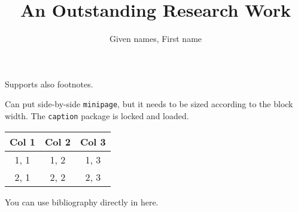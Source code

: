 \documentclass[a2paper]{bigsposter}
\author{Given names, First name}
\title{An Outstanding Research Work}
\institute{Famous Research Institute}
\newcommand{\emptybox}[2]{\framebox[#1]{\rule{0pt}{#2}}}
\begin{document}
  \maketitle
  \begin{blockrow}
    \textcolor{lightgray}{\lipsum[1]}
    Supports also footnotes.
  \blockbreak
    \textcolor{lightgray}{\lipsum[2]}
    \begin{minipage}[t]{0.3\blockwidth}
      Can put side-by-side \texttt{minipage}, but it needs to be sized according to the block width. The \texttt{caption} package is locked and loaded.
    \end{minipage}
    \begin{minipage}[t]{0.7\blockwidth}
      \begin{blockfigure}
        \emptybox{0.9\textwidth}{4em}
      \end{blockfigure}
    \end{minipage}
  \end{blockrow}
  \begin{blockrow}[3]
    \begin{blockfigure}
      \emptybox{0.8\blockwidth}{5em}
    \end{blockfigure}
    \textcolor{lightgray}{\lipsum[3]}
  \blockbreak
    \textcolor{lightgray}{\lipsum[4]}
    \begin{blocktable}
      \begin{tabular}{c|c|c}
        \textbf{Col 1} & \textbf{Col 2} & \textbf{Col 3} \\\hline\hline
        1, 1 & 1, 2 & 1, 3 \\
        2, 1 & 2, 2 & 2, 3 \\\hline
      \end{tabular}
    \end{blocktable}
    \textcolor{lightgray}{\lipsum[5]}
  \blockbreak
    \textcolor{lightgray}{\lipsum[6]}
    You can use bibliography directly in here.
    \nocite{*}
    
    \blockfoot
  \end{blockrow}
\end{document}

